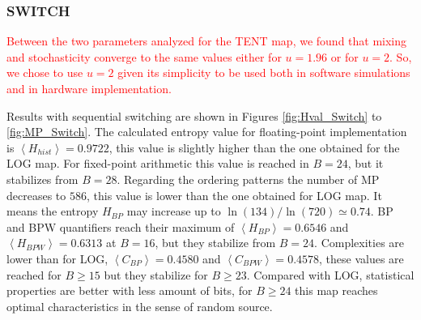 \subsubsection{SWITCH} \label{sssec:switch}

\textcolor{red}{Between the two parameters analyzed for the TENT map, we found that mixing and stochasticity converge to the same values either for $u = 1.96$ or for $u = 2$.
So, we chose to use $u = 2$ given its simplicity to be used both in software simulations and in hardware implementation.}

Results with sequential switching are shown in Figures \ref{fig:Hval_Switch} to \ref{fig:MP_Switch}.
The calculated entropy value for floating-point implementation is $\left\langle H_{hist}\right\rangle =0.9722$, this value is slightly higher than the one obtained for the LOG map. 
For fixed-point arithmetic this value is reached in $B=24$, but it stabilizes from $B=28$.
Regarding the ordering patterns the number of MP decreases to $586$, this value is lower than the one obtained for LOG map.
It means the entropy $H_{BP}$ may increase up to $\ln(134)/\ln(720)\simeq 0.74$.
BP and BPW quantifiers reach their maximum of $\left\langle H_{BP}\right\rangle =0.6546$ and $\left\langle H_{BPW}\right\rangle =0.6313$ at $B=16$, but they stabilize from $B=24$.
Complexities are lower than for LOG, $\left\langle C_{BP}\right\rangle =0.4580$ and $\left\langle C_{BPW}\right\rangle =0.4578$, these values are reached for $B \geq 15$ but they stabilize for $B \geq 23$.
Compared with LOG, statistical properties are better with less amount of bits, for $B \geq 24$ this map reaches optimal characteristics in the sense of random source.

